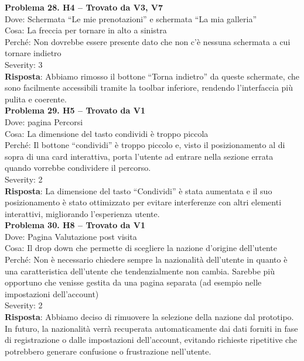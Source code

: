 \documentclass{article}
\begin{document}
\noindent \textbf{Problema 28. H4 – Trovato da V3, V7} \\
Dove: Schermata “Le mie prenotazioni” e schermata “La mia galleria” \\
Cosa: La freccia per tornare in alto a sinistra \\
Perché: Non dovrebbe essere presente dato che non c'è nessuna schermata a cui tornare indietro \\
Severity: 3 \\
\textbf{Risposta}: Abbiamo rimosso il bottone “Torna indietro” da queste schermate, che sono facilmente accessibili tramite la toolbar inferiore, rendendo l’interfaccia più pulita e coerente.\\

\noindent \textbf{Problema 29. H5 – Trovato da V1} \\
Dove: pagina Percorsi \\
Cosa: La dimensione del tasto condividi è troppo piccola \\
Perché: Il bottone “condividi” è troppo piccolo e, visto il posizionamento al di sopra di una card interattiva, porta l’utente ad entrare nella sezione errata quando vorrebbe condividere il percorso. \\
Severity: 2 \\
\textbf{Risposta}: La dimensione del tasto “Condividi” è stata aumentata e il suo posizionamento è stato ottimizzato per evitare interferenze con altri elementi interattivi, migliorando l’esperienza utente.\\

\noindent \textbf{Problema 30. H8 – Trovato da V1} \\
Dove: Pagina Valutazione post visita \\
Cosa: Il drop down che permette di scegliere la nazione d’origine dell’utente \\
Perché: Non è necessario chiedere sempre la nazionalità dell’utente in quanto è una caratteristica dell’utente che tendenzialmente non cambia. Sarebbe più opportuno che venisse gestita da una pagina separata (ad esempio nelle impostazioni dell’account) \\
Severity: 2 \\
\textbf{Risposta}: Abbiamo deciso di rimuovere la selezione della nazione dal prototipo. In futuro, la nazionalità verrà recuperata automaticamente dai dati forniti in fase di registrazione o dalle impostazioni dell’account, evitando richieste ripetitive che potrebbero generare confusione o frustrazione nell’utente.\\
\end{document}
